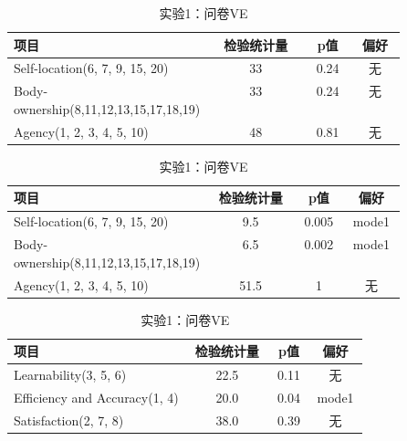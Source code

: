 \begin{table}[htbp]
    \centering
    \begin{minipage}{\textwidth}
        \centering
        \caption{实验1：问卷EC}
        \label{tab:5.4-1}
        \begin{tabular}{@{}p{0.5\linewidth}ccc@{}}
            \toprule
            \textbf{项目}                            & \textbf{检验统计量} & \textbf{p值} & \textbf{偏好} \\ \midrule
            Self-location(6, 7, 9, 15, 20)         & 33              & 0.24         & 无           \\
            Body-ownership(8,11,12,13,15,17,18,19) & 33              & 0.24         & 无           \\
            Agency(1, 2, 3, 4, 5, 10)              & 48              & 0.81         & 无           \\ \bottomrule
        \end{tabular}
    \end{minipage}

    \vspace{0.5cm}

    \begin{minipage}{\textwidth}
        \centering
        \caption{实验2：问卷EC}
        \begin{tabular}{@{}p{0.5\linewidth}ccc@{}}
            \toprule
            \textbf{项目}                            & \textbf{检验统计量} & \textbf{p值} & \textbf{偏好} \\ \midrule
            Self-location(6, 7, 9, 15, 20)         & 9.5             & 0.005        & mode1       \\
            Body-ownership(8,11,12,13,15,17,18,19) & 6.5             & 0.002        & mode1       \\
            Agency(1, 2, 3, 4, 5, 10)              & 51.5            & 1            & 无           \\ \bottomrule
        \end{tabular}
    \end{minipage}

    \vspace{0.5cm}

    \begin{minipage}{\textwidth}
        \centering
        \caption{实验1：问卷VE}
        \begin{tabular}{@{}p{0.5\linewidth}ccc@{}}
            \toprule
            \textbf{项目}                 & \textbf{检验统计量} & \textbf{p值} & \textbf{偏好} \\ \midrule
            Learnability(3, 5, 6)         & 22.5            & 0.11         & 无           \\
            Efficiency and Accuracy(1, 4) & 20.0            & 0.04         & mode1       \\
            Satisfaction(2, 7, 8)         & 38.0            & 0.39         & 无           \\ \bottomrule
        \end{tabular}
    \end{minipage}


\end{table}
